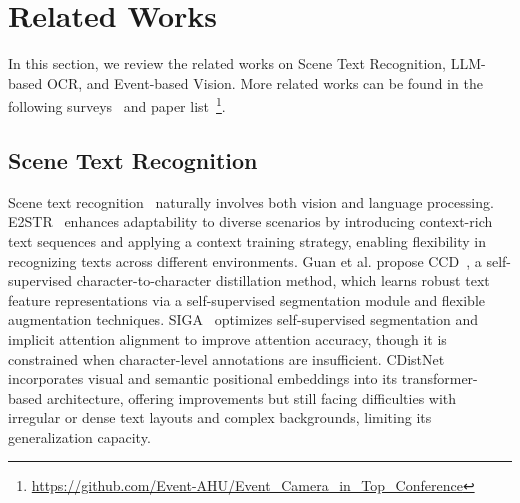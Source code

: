 \section{Related Works}
\label{sec::relatedWorks}

In this section, we review the related works on Scene Text Recognition, LLM-based OCR, and Event-based Vision. More related works can be found in the following surveys~\cite{long2021STRDsurvey, wang2023MMPTMsurvey, gallego2020eventsurvey} and paper list~\footnote{\url{https://github.com/Event-AHU/Event_Camera_in_Top_Conference}}. 


\subsection{Scene Text Recognition} 
Scene text recognition~\cite{wang2011end,shi2016end,liao2019scene,han2024spotlight} naturally involves both vision and language processing. 
E2STR~\cite{zhao2024E2STR} enhances adaptability to diverse scenarios by introducing context-rich text sequences and applying a context training strategy, enabling flexibility in recognizing texts across different environments. 
Guan et al. propose CCD~\cite{Guan2023CCD}, a self-supervised character-to-character distillation method, which learns robust text feature representations via a self-supervised segmentation module and flexible augmentation techniques. 
SIGA~\cite{guan2023SIGA} optimizes self-supervised segmentation and implicit attention alignment to improve attention accuracy, though it is constrained when character-level annotations are insufficient. 
CDistNet~\cite{zheng2024cdistnet} incorporates visual and semantic positional embeddings into its transformer-based architecture, offering improvements but still facing difficulties with irregular or dense text layouts and complex backgrounds, limiting its generalization capacity. 
